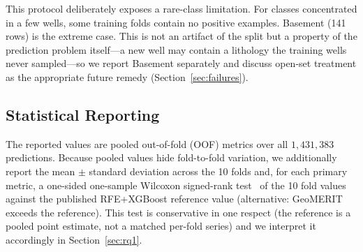 \documentclass[bdcc,article,submit,pdftex,moreauthors]{Definitions/mdpi}
\begin{document}
This protocol deliberately exposes a rare-class limitation. For classes concentrated in a few
wells, some training folds contain no positive examples. Basement (141 rows) is the extreme
case. This is not an artifact of the split but a property of the prediction problem itself---a
new well may contain a lithology the training wells never sampled---so we report Basement
separately and discuss open-set treatment as the appropriate future remedy
(Section~\ref{sec:failures}).

\subsection{Statistical Reporting}
\label{sec:stats}
The reported values are pooled out-of-fold (OOF) metrics over all $1{,}431{,}383$ predictions.
Because pooled values hide fold-to-fold variation, we additionally report the mean
$\pm$ standard deviation across the 10 folds and, for each primary metric, a one-sided
one-sample Wilcoxon signed-rank test~\cite{wilcoxon1945} of the 10 fold values against the
published RFE+XGBoost reference value (alternative: GeoMERIT exceeds the reference). This
test is conservative in one respect (the reference is a pooled point estimate, not a matched
per-fold series) and we interpret it accordingly in Section~\ref{sec:rq1}.
\end{document}
